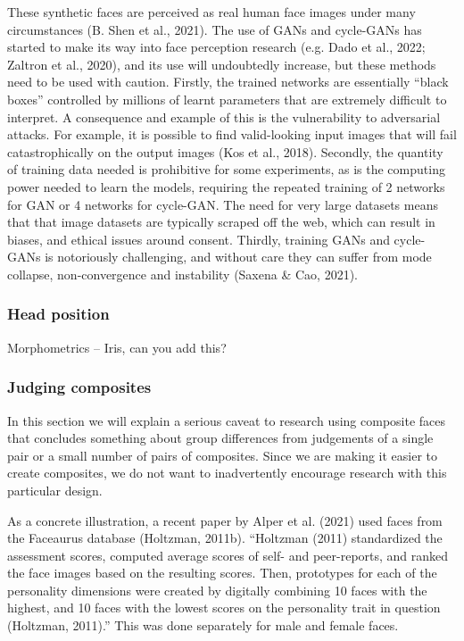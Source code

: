 \documentclass[
  doc,floatsintext]{apa6}
\begin{document}
These synthetic faces are perceived as real human face images under many circumstances (B. Shen et al., 2021). The use of GANs and cycle-GANs has started to make its way into face perception research (e.g. Dado et al., 2022; Zaltron et al., 2020), and its use will undoubtedly increase, but these methods need to be used with caution. Firstly, the trained networks are essentially ``black boxes'' controlled by millions of learnt parameters that are extremely difficult to interpret. A consequence and example of this is the vulnerability to adversarial attacks. For example, it is possible to find valid-looking input images that will fail catastrophically on the output images (Kos et al., 2018). Secondly, the quantity of training data needed is prohibitive for some experiments, as is the computing power needed to learn the models, requiring the repeated training of 2 networks for GAN or 4 networks for cycle-GAN. The need for very large datasets means that that image datasets are typically scraped off the web, which can result in biases, and ethical issues around consent. Thirdly, training GANs and cycle-GANs is notoriously challenging, and without care they can suffer from mode collapse, non-convergence and instability (Saxena \& Cao, 2021).

\hypertarget{head-position}{%
\subsubsection{Head position}\label{head-position}}

Morphometrics -- Iris, can you add this?

\hypertarget{judging-composites}{%
\subsubsection{Judging composites}\label{judging-composites}}

In this section we will explain a serious caveat to research using composite faces that concludes something about group differences from judgements of a single pair or a small number of pairs of composites. Since we are making it easier to create composites, we do not want to inadvertently encourage research with this particular design.

As a concrete illustration, a recent paper by Alper et al. (2021) used faces from the Faceaurus database (Holtzman, 2011b). ``Holtzman (2011) standardized the assessment scores, computed average scores of self- and peer-reports, and ranked the face images based on the resulting scores. Then, prototypes for each of the personality dimensions were created by digitally combining 10 faces with the highest, and 10 faces with the lowest scores on the personality trait in question (Holtzman, 2011).'' This was done separately for male and female faces.
\end{document}
